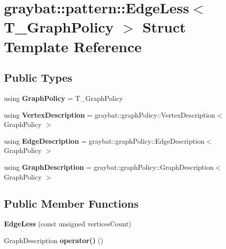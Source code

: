 \hypertarget{structgraybat_1_1pattern_1_1EdgeLess}{}\section{graybat\+:\+:pattern\+:\+:Edge\+Less$<$ T\+\_\+\+Graph\+Policy $>$ Struct Template Reference}
\label{structgraybat_1_1pattern_1_1EdgeLess}
\subsection*{Public Types}
\begin{DoxyCompactItemize}
\item 
\hypertarget{structgraybat_1_1pattern_1_1EdgeLess_a7e530e2105a44c9c6b16bd6e76596baa}{}using {\bfseries Graph\+Policy} = T\+\_\+\+Graph\+Policy\label{structgraybat_1_1pattern_1_1EdgeLess_a7e530e2105a44c9c6b16bd6e76596baa}

\item 
\hypertarget{structgraybat_1_1pattern_1_1EdgeLess_a0273ec409b141a15e0ac4f232d5a56ec}{}using {\bfseries Vertex\+Description} = graybat\+::graph\+Policy\+::\+Vertex\+Description$<$ Graph\+Policy $>$\label{structgraybat_1_1pattern_1_1EdgeLess_a0273ec409b141a15e0ac4f232d5a56ec}

\item 
\hypertarget{structgraybat_1_1pattern_1_1EdgeLess_aad27f94e9e716ec9e9fedb300413c256}{}using {\bfseries Edge\+Description} = graybat\+::graph\+Policy\+::\+Edge\+Description$<$ Graph\+Policy $>$\label{structgraybat_1_1pattern_1_1EdgeLess_aad27f94e9e716ec9e9fedb300413c256}

\item 
\hypertarget{structgraybat_1_1pattern_1_1EdgeLess_aa9f05ce92d5e357e2a4a8d8b53a5b994}{}using {\bfseries Graph\+Description} = graybat\+::graph\+Policy\+::\+Graph\+Description$<$ Graph\+Policy $>$\label{structgraybat_1_1pattern_1_1EdgeLess_aa9f05ce92d5e357e2a4a8d8b53a5b994}

\end{DoxyCompactItemize}
\subsection*{Public Member Functions}
\begin{DoxyCompactItemize}
\item 
\hypertarget{structgraybat_1_1pattern_1_1EdgeLess_a1a1e1d85989fba36558ffbd1a3bd3a2a}{}{\bfseries Edge\+Less} (const unsigned vertices\+Count)\label{structgraybat_1_1pattern_1_1EdgeLess_a1a1e1d85989fba36558ffbd1a3bd3a2a}

\item 
\hypertarget{structgraybat_1_1pattern_1_1EdgeLess_a7ace3d1f6d82eaeea128256435e25b55}{}Graph\+Description {\bfseries operator()} ()\label{structgraybat_1_1pattern_1_1EdgeLess_a7ace3d1f6d82eaeea128256435e25b55}

\end{DoxyCompactItemize}
